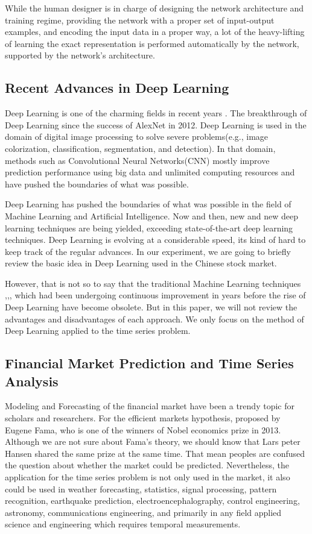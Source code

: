 \documentclass{article}
\begin{document}
While the human designer is in charge of designing the network architecture and training regime, providing the network with a proper set of input-output examples, and encoding the input data in a proper way, a lot of the heavy-lifting of learning the exact representation is performed automatically by the network, supported by the network's architecture.

\subsection{Recent Advances in Deep Learning}
Deep Learning is one of the charming fields in recent years \citep{DBLP:books/daglib/0040158}. The breakthrough of Deep Learning since the success of AlexNet \citep{DBLP:journals/corr/abs-1710-07035} in 2012. Deep Learning is used in the domain of digital image processing to solve severe problems(e.g., image colorization, classification, segmentation, and detection). In that domain,  methods such as Convolutional Neural Networks(CNN) mostly improve prediction performance using big data and unlimited computing resources and have pushed the boundaries of what was possible.

Deep Learning has pushed the boundaries of what was possible in the field of Machine Learning and Artificial Intelligence. Now and then, new and new deep learning techniques are being yielded, exceeding state-of-the-art deep learning techniques. Deep Learning is evolving at a considerable speed, its kind of hard to keep track of the regular advances. In our experiment, we are going to briefly review the basic idea in Deep Learning used in the Chinese stock market.

However, that is not so to say that the traditional Machine Learning techniques \citep{DBLP:journals/tnn/CaoT03},\citep{Kercheval2015Modelling},\citep{DBLP:conf/isnn/ZhaiHH07},\citep{DBLP:journals/isci/ArmanoMM05} which had been undergoing continuous improvement in years before the rise of Deep Learning have become obsolete. But in this paper, we will not review the advantages and disadvantages of each approach. We only focus on the method of Deep Learning applied to the time series problem.

\subsection{Financial Market Prediction and Time Series Analysis}
Modeling and Forecasting of the financial market have been a trendy topic for scholars and researchers. For the efficient markets hypothesis, proposed by Eugene Fama, who is one of the winners of Nobel economics prize in 2013. Although we are not sure about Fama's theory, we should know that Lars peter Hansen shared the same prize at the same time. That mean peoples are confused the question about whether the market could be predicted. Nevertheless, the application for the time series problem is not only used in the market, it also could be used in weather forecasting, statistics, signal processing, pattern recognition, earthquake prediction, electroencephalography, control engineering, astronomy, communications engineering, and primarily in any field applied science and engineering which requires temporal measurements.
\end{document}
